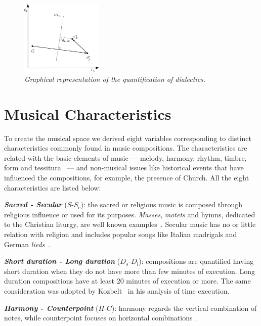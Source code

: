 \documentclass[
 aip,
 jmp,
 amsmath,amssymb,
 reprint,
]{revtex4-1}
\begin{document}
\begin{figure}
        \begin{center}
                \includegraphics[width=0.35\textwidth]{dialetica_.eps}
        \end{center}
        \caption{\it Graphical representation of the quantification of dialectics\cite{Fabbri}.}
        \label{fig.2}
\end{figure}




\section{Musical Characteristics}

To create the musical space we derived eight variables corresponding to
distinct characteristics commonly found in music compositions. The
characteristics are related with the basic elements of music --- melody,
harmony, rhythm, timbre, form and tessitura~\cite{BennettHistory} --- and
non-musical issues like historical events that have influenced the
compositions, for example, the
presence of Church. All the eight
characteristics are listed below:

{\bf \em{ Sacred - Secular}} ($S$-$S_c$): the sacred or religious music is
composed through religious influence or used for its purposes. \textit{Masses},
\textit{motets} and hymns, dedicated to the Christian liturgy, are well known examples~\cite{Lovelock}. Secular
music has no or little relation with religion and includes
popular songs like Italian madrigals and German \textit{lieds}~\cite{BennettHistory}. 

{\bf \em{ Short duration - Long duration}} ($D_s$-$D_l$): compositions are
quantified having short duration when they do not have more than few minutes
of execution. Long duration compositions have at least 20 minutes of execution or
more. The same consideration was adopted by Kozbelt~\cite{Kozbelt01012009,
  Kozbelt01012007} in his analysis of time execution.

{\bf \em{ Harmony - Counterpoint}} ($H$-$C$): harmony regards the
vertical combination of notes, while counterpoint focuses on
horizontal combinations~\cite{BennettHistory}.
\end{document}
